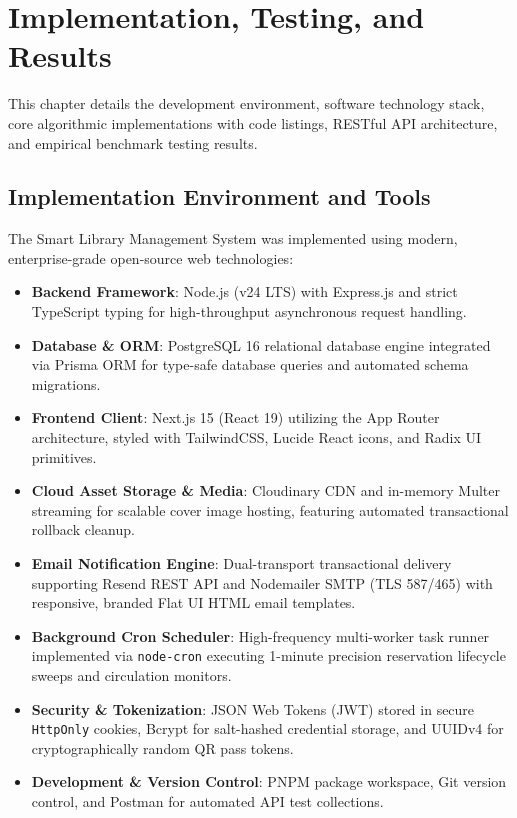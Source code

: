 \chapter{Implementation, Testing, and Results}

This chapter details the development environment, software technology stack, core algorithmic implementations with code listings, RESTful API architecture, and empirical benchmark testing results.

\section{Implementation Environment and Tools}
The Smart Library Management System was implemented using modern, enterprise-grade open-source web technologies:

\begin{itemize}
    \item \textbf{Backend Framework}: Node.js (v24 LTS) with Express.js and strict TypeScript typing for high-throughput asynchronous request handling.
    \item \textbf{Database \& ORM}: PostgreSQL 16 relational database engine integrated via Prisma ORM for type-safe database queries and automated schema migrations.
    \item \textbf{Frontend Client}: Next.js 15 (React 19) utilizing the App Router architecture, styled with TailwindCSS, Lucide React icons, and Radix UI primitives.
    \item \textbf{Cloud Asset Storage \& Media}: Cloudinary CDN and in-memory Multer streaming for scalable cover image hosting, featuring automated transactional rollback cleanup.
    \item \textbf{Email Notification Engine}: Dual-transport transactional delivery supporting Resend REST API and Nodemailer SMTP (TLS 587/465) with responsive, branded Flat UI HTML email templates.
    \item \textbf{Background Cron Scheduler}: High-frequency multi-worker task runner implemented via \texttt{node-cron} executing 1-minute precision reservation lifecycle sweeps and circulation monitors.
    \item \textbf{Security \& Tokenization}: JSON Web Tokens (JWT) stored in secure \texttt{HttpOnly} cookies, Bcrypt for salt-hashed credential storage, and UUIDv4 for cryptographically random QR pass tokens.
    \item \textbf{Development \& Version Control}: PNPM package workspace, Git version control, and Postman for automated API test collections.
\end{itemize}

